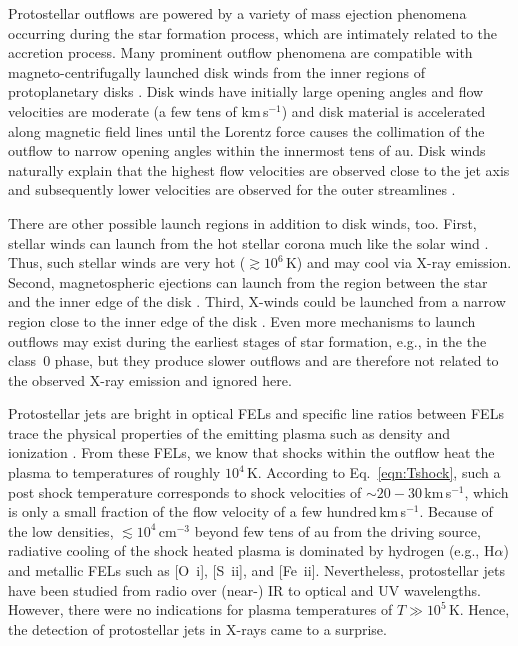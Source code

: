 Protostellar outflows are powered by a variety of mass ejection phenomena occurring during the star formation process, which are intimately related to the accretion process. 
Many prominent outflow phenomena are compatible with magneto-centrifugally launched disk winds from the inner regions of protoplanetary disks \citep[roughly 0.1\,au to 10\,au, see][]{Frank_2014}. Disk winds have initially large opening angles and flow velocities are moderate (a few tens of km\,s$^{-1}$) and disk material is accelerated along magnetic field lines until the Lorentz force causes the collimation of the outflow to narrow opening angles within the innermost tens of au. Disk winds naturally explain that the highest flow velocities are observed close to the jet axis and subsequently lower velocities are observed for the outer streamlines \cite{Bacciotti_2000}.


There are other possible launch regions in addition to disk winds, too. First, stellar winds can launch from the hot stellar corona much like the solar wind \citep{Matt_2005}. Thus, such stellar winds are very hot ($\gtrsim10^6$\,K) and may cool via X-ray emission. Second, magnetospheric ejections can launch from the region between the star and the inner edge of the disk \citep{Zanni_2013}. Third, X-winds could be launched from a narrow region close to the inner edge of the disk \citep{Shu_1994}. Even more mechanisms to launch outflows may exist  during the earliest stages of star formation, e.g., in the the class~0 phase, but they produce slower outflows and are therefore not related to the observed X-ray emission and ignored here.

Protostellar jets are bright in optical FELs and specific line ratios between FELs trace the physical properties of the emitting plasma such as density and ionization \cite{Bacciotti_1999}. From these FELs, we know that shocks within the outflow heat the plasma to temperatures of roughly $10^4\,$K. According to Eq.~\ref{eqn:Tshock}, such a post shock temperature corresponds to shock velocities of $\sim20-30$\,km\,s$^{-1}$, which is only a small fraction of the flow velocity of a few hundred\,km\,s$^{-1}$.
%
Because of the low densities, $\lesssim10^4\,$cm$^{-3}$ beyond few tens of au from the driving source, radiative cooling of the shock heated plasma is dominated by hydrogen (e.g., H$\alpha$) and metallic FELs such as [O~{\sc i}], [S~{\sc ii}], and [Fe~{\sc ii}].
Nevertheless, protostellar jets have been studied from radio over (near-) IR to optical and UV wavelengths.
However, there were no indications for plasma temperatures of $T\gg10^5\,$K. Hence, the detection of protostellar jets in X-rays came to a surprise.

